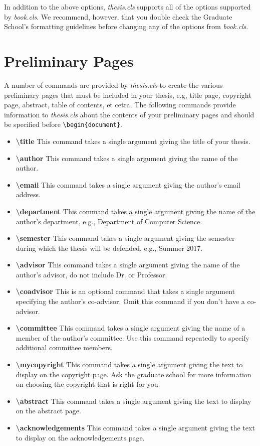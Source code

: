 \documentclass[master]{thesis}
\begin{document}
In addition to the above options, \textit{thesis.cls} supports all of the options supported by \textit{book.cls}.  We recommend, however, that you double check the Graduate School's formatting guidelines before changing any of the options from \textit{book.cls}.

\section{Preliminary Pages}

A number of commands are provided by \textit{thesis.cls} to create the various preliminary pages that must be included in your thesis, e.g, title page, copyright page, abstract, table of contents, et cetra.  The following commands provide information to \textit{thesis.cls} about the contents of your preliminary pages and should be specified before \verb|\begin{document}|.

\begin{itemize}
    \item \textbf{\textbackslash title}  This command takes a single argument giving the title of your thesis.
    \item \textbf{\textbackslash author}  This command takes a single argument giving the name of the author.
    \item \textbf{\textbackslash email}  This command takes a single argument giving the author's email address.
    \item \textbf{\textbackslash department}  This command takes a single argument giving the name of the author's department, e.g., Department of Computer Science.
    \item \textbf{\textbackslash semester}  This command takes a single argument giving the semester during which the thesis will be defended, e.g., Summer 2017.
    \item \textbf{\textbackslash advisor}  This command takes a single argument giving the name of the author's advisor, do not include Dr. or Professor.
    \item \textbf{\textbackslash coadvisor}  This is an optional command that takes a single argument specifying the author's co-advisor.  Omit this command if you don't have a co-advisor.
    \item \textbf{\textbackslash committee}  This command takes a single argument giving the name of a member of the author's committee.  Use this command repeatedly to specify additional committee members.
    \item \textbf{\textbackslash mycopyright}  This command takes a single argument giving the text to display on the copyright page.  Ask the graduate school for more information on choosing the copyright that is right for you.
    \item \textbf{\textbackslash abstract}  This command takes a single argument giving the text to display on the abstract page.
    \item \textbf{\textbackslash acknowledgements}  This command takes a single argument giving the text to display on the acknowledgements page.
\end{itemize}
\end{document}
